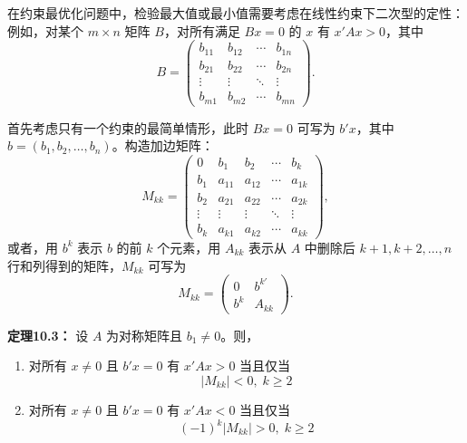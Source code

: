 \begin{translation}
在约束最优化问题中，检验最大值或最小值需要考虑在线性约束下二次型的定性：例如，对某个 $m \times n$ 矩阵 $B$，对所有满足 $Bx = 0$ 的 $x$ 有 $x'Ax > 0$，其中
\[
B = \begin{pmatrix}
b_{11} & b_{12} & \cdots & b_{1n} \\
b_{21} & b_{22} & \cdots & b_{2n} \\
\vdots & \vdots & \ddots & \vdots \\
b_{m1} & b_{m2} & \cdots & b_{mn}
\end{pmatrix}.
\]

首先考虑只有一个约束的最简单情形，此时 $Bx = 0$ 可写为 $b'x$，其中 $b = (b_1, b_2, \ldots, b_n)$。构造加边矩阵：
\[
M_{kk} = \begin{pmatrix}
0 & b_1 & b_2 & \cdots & b_k \\
b_1 & a_{11} & a_{12} & \cdots & a_{1k} \\
b_2 & a_{21} & a_{22} & \cdots & a_{2k} \\
\vdots & \vdots & \vdots & \ddots & \vdots \\
b_k & a_{k1} & a_{k2} & \cdots & a_{kk}
\end{pmatrix},
\]
或者，用 $b^k$ 表示 $b$ 的前 $k$ 个元素，用 $A_{kk}$ 表示从 $A$ 中删除后 $k+1, k+2, \ldots, n$ 行和列得到的矩阵，$M_{kk}$ 可写为
\[
M_{kk} = \begin{pmatrix} 0 & b^{k'} \\ b^k & A_{kk} \end{pmatrix}.
\]

\textbf{定理10.3：} 设 $A$ 为对称矩阵且 $b_1 \neq 0$。则，
\begin{enumerate}
\item 对所有 $x \neq 0$ 且 $b'x = 0$ 有 $x'Ax > 0$ 当且仅当
\[
|M_{kk}| < 0,\; k \geq 2
\]
\item 对所有 $x \neq 0$ 且 $b'x = 0$ 有 $x'Ax < 0$ 当且仅当
\[
(-1)^k|M_{kk}| > 0,\; k \geq 2
\]
\end{enumerate}
\end{translation}

